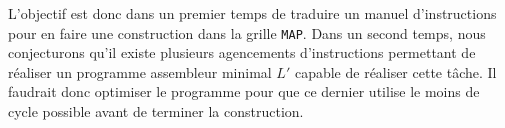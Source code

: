 \noindent
L'objectif est donc dans un premier temps de traduire un manuel 
d'instructions pour en faire une construction dans la grille 
\texttt{MAP}. Dans un second temps, nous conjecturons qu'il existe
plusieurs agencements d'instructions permettant de réaliser un 
programme assembleur minimal $L'$ capable de réaliser cette tâche. Il 
faudrait donc optimiser le programme pour que ce dernier utilise le 
moins de cycle possible avant de terminer la construction.
